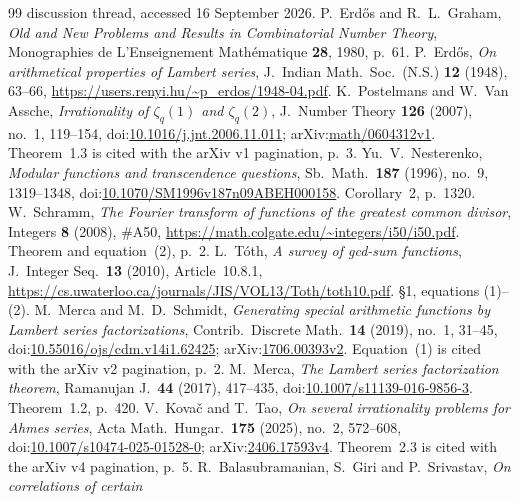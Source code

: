 \begin{thebibliography}{99}
{discussion thread}, accessed 16 September 2026.
P.~Erd\H{o}s and R.~L.~Graham, \emph{Old and New Problems and Results in
Combinatorial Number Theory}, Monographies de L'Enseignement
Math\'ematique \textbf{28}, 1980, p.~61.
P.~Erd\H{o}s, \emph{On arithmetical properties of Lambert series},
J.\ Indian Math.\ Soc.\ (N.S.) \textbf{12} (1948), 63--66,
\url{https://users.renyi.hu/~p_erdos/1948-04.pdf}.
K.~Postelmans and W.~Van Assche, \emph{Irrationality of $\zeta_q(1)$ and
$\zeta_q(2)$}, J.\ Number Theory \textbf{126} (2007), no.~1, 119--154,
doi:\href{https://doi.org/10.1016/j.jnt.2006.11.011}{10.1016/j.jnt.2006.11.011};
arXiv:\href{https://arxiv.org/abs/math/0604312v1}{math/0604312v1}.
Theorem~1.3 is cited with the arXiv v1 pagination, p.~3.
Yu.~V.~Nesterenko, \emph{Modular functions and transcendence questions},
Sb.\ Math.\ \textbf{187} (1996), no.~9, 1319--1348,
doi:\href{https://doi.org/10.1070/SM1996v187n09ABEH000158}{10.1070/SM1996v187n09ABEH000158}.
Corollary~2, p.~1320.
W.~Schramm, \emph{The Fourier transform of functions of the greatest common
divisor}, Integers \textbf{8} (2008), \#A50,
\url{https://math.colgate.edu/~integers/i50/i50.pdf}.
Theorem and equation~(2), p.~2.
L.~T\'oth, \emph{A survey of gcd-sum functions}, J.\ Integer Seq.\ \textbf{13}
(2010), Article~10.8.1,
\url{https://cs.uwaterloo.ca/journals/JIS/VOL13/Toth/toth10.pdf}.
\S1, equations (1)--(2).
M.~Merca and M.~D.~Schmidt, \emph{Generating special arithmetic functions by
Lambert series factorizations}, Contrib.\ Discrete Math.\ \textbf{14} (2019),
no.~1, 31--45,
doi:\href{https://doi.org/10.55016/ojs/cdm.v14i1.62425}{10.55016/ojs/cdm.v14i1.62425};
arXiv:\href{https://arxiv.org/abs/1706.00393v2}{1706.00393v2}.
Equation~(1) is cited with the arXiv v2 pagination, p.~2.
M.~Merca, \emph{The Lambert series factorization theorem},
Ramanujan J.\ \textbf{44} (2017), 417--435,
doi:\href{https://doi.org/10.1007/s11139-016-9856-3}{10.1007/s11139-016-9856-3}.
Theorem~1.2, p.~420.
V.~Kova\v{c} and T.~Tao, \emph{On several irrationality problems for Ahmes
series}, Acta Math.\ Hungar.\ \textbf{175} (2025), no.~2, 572--608,
doi:\href{https://doi.org/10.1007/s10474-025-01528-0}{10.1007/s10474-025-01528-0};
arXiv:\href{https://arxiv.org/abs/2406.17593v4}{2406.17593v4}.
Theorem~2.3 is cited with the arXiv v4 pagination, p.~5.
R.~Balasubramanian, S.~Giri and P.~Srivastav, \emph{On correlations of certain
}
\end{thebibliography}
